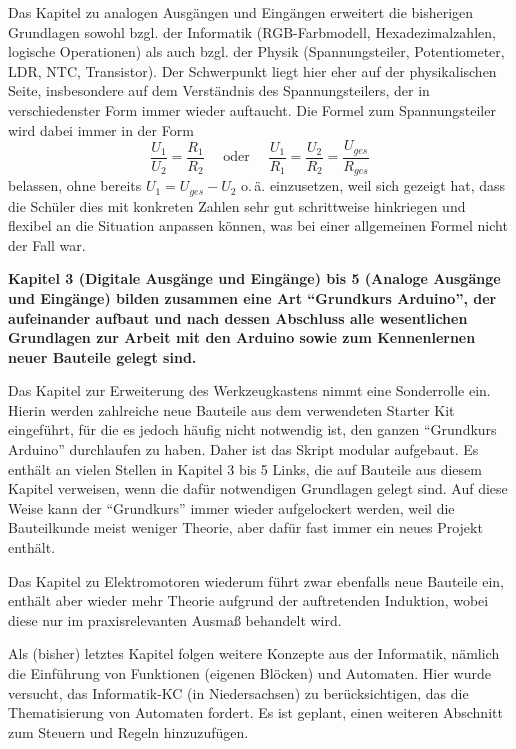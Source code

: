 Das Kapitel zu analogen Ausgängen und Eingängen erweitert die bisherigen Grundlagen sowohl bzgl. der Informatik (RGB-Farbmodell, Hexadezimalzahlen, logische Operationen) als auch bzgl. der Physik (Spannungsteiler, Potentiometer, LDR, NTC, Transistor). Der Schwerpunkt liegt hier eher auf der physikalischen Seite, insbesondere auf dem Verständnis des Spannungsteilers, der in verschiedenster Form immer wieder auftaucht. Die Formel zum Spannungsteiler wird dabei immer in der Form
\begin{equation*}
	\frac{U_1}{U_2} = \frac{R_1}{R_2} \quad \text{ oder } \quad \frac{U_1}{R_1} = \frac{U_2}{R_2} = \frac{U_{ges}}{R_{ges}}
\end{equation*}
belassen, ohne bereits $U_1 = U_{ges} - U_2$ o.\,ä. einzusetzen, weil sich gezeigt hat, dass die Schüler dies mit konkreten Zahlen sehr gut schrittweise hinkriegen und flexibel an die Situation anpassen können, was bei einer allgemeinen Formel nicht der Fall war.

\textbf{Kapitel 3 (Digitale Ausgänge und Eingänge) bis 5 (Analoge Ausgänge und Eingänge) bilden zusammen eine Art \enquote{Grundkurs Arduino}, der aufeinander aufbaut und nach dessen Abschluss alle wesentlichen Grundlagen zur Arbeit mit den Arduino sowie zum Kennenlernen neuer Bauteile gelegt sind.}

Das Kapitel zur Erweiterung des Werkzeugkastens nimmt eine Sonderrolle ein. Hierin werden zahlreiche neue Bauteile aus dem verwendeten Starter Kit eingeführt, für die es jedoch häufig nicht notwendig ist, den ganzen \enquote{Grundkurs Arduino} durchlaufen zu haben. Daher ist das Skript modular aufgebaut. Es enthält an vielen Stellen in Kapitel 3 bis 5 Links, die auf Bauteile aus diesem Kapitel verweisen, wenn die dafür notwendigen Grundlagen gelegt sind. Auf diese Weise kann der \enquote{Grundkurs} immer wieder aufgelockert werden, weil die Bauteilkunde meist weniger Theorie, aber dafür fast immer ein neues Projekt enthält.

Das Kapitel zu Elektromotoren wiederum führt zwar ebenfalls neue Bauteile ein, enthält aber wieder mehr Theorie aufgrund der auftretenden Induktion, wobei diese nur im praxisrelevanten Ausmaß behandelt wird.

Als (bisher) letztes Kapitel folgen weitere Konzepte aus der Informatik, nämlich die Einführung von Funktionen (eigenen Blöcken) und Automaten. Hier wurde versucht, das Informatik-KC (in Niedersachsen) zu berücksichtigen, das die Thematisierung von Automaten fordert. Es ist geplant, einen weiteren Abschnitt zum Steuern und Regeln hinzuzufügen.

